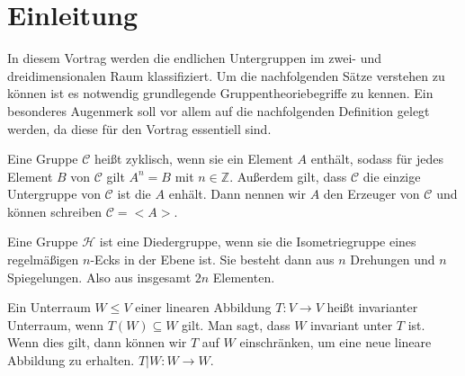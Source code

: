 \section{Einleitung}
In diesem Vortrag werden die endlichen Untergruppen im zwei- und dreidimensionalen Raum klassifiziert. Um die nachfolgenden Sätze verstehen zu können ist es notwendig grundlegende Gruppentheoriebegriffe zu kennen. Ein besonderes Augenmerk soll vor allem auf die nachfolgenden Definition gelegt werden, da diese für den Vortrag essentiell sind.
\begin{defi}
 Eine Gruppe $\mathcal{C}$ heißt zyklisch, wenn sie ein Element $A$ enthält, sodass für jedes Element $B$ von $\mathcal{C}$ gilt $A^n = B$ mit $n \in \mathbb{Z}$. Außerdem gilt, dass $\mathcal{C}$ die einzige Untergruppe von $\mathcal{C}$ ist die $A$ enhält. Dann nennen wir $A$ den Erzeuger von $\mathcal{C}$ und können schreiben $\mathcal{C} = <A>$.
\end{defi}
\begin{defi}[Diedergruppe]
 Eine Gruppe $\mathcal{H}$ ist eine Diedergruppe, wenn sie die Isometriegruppe eines regelmäßigen $n$-Ecks in der Ebene ist. Sie besteht dann aus $n$ Drehungen und $n$ Spiegelungen. Also aus insgesamt $2n$ Elementen.
\end{defi}
\begin{defi}
 Ein Unterraum $W \leq V$ einer linearen Abbildung $T:V \rightarrow V$ heißt invarianter Unterraum, wenn $T(W) \subseteq W$ gilt. Man sagt, dass $W$ invariant unter $T$ ist. Wenn dies gilt, dann können wir $T$ auf $W$ einschränken, um eine neue lineare Abbildung zu erhalten. $T|W:W\rightarrow W$.
\end{defi}
